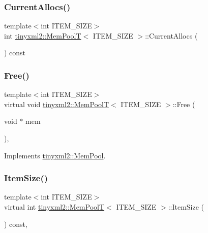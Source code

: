 \subsubsection{\texorpdfstring{Current\+Allocs()}{CurrentAllocs()}}
{\footnotesize\ttfamily template$<$int I\+T\+E\+M\+\_\+\+S\+I\+ZE$>$ \\
int \mbox{\hyperlink{classtinyxml2_1_1_mem_pool_t}{tinyxml2\+::\+Mem\+PoolT}}$<$ I\+T\+E\+M\+\_\+\+S\+I\+ZE $>$\+::Current\+Allocs (\begin{DoxyParamCaption}{ }\end{DoxyParamCaption}) const\hspace{0.3cm}{\ttfamily [inline]}}

\mbox{\label{classtinyxml2_1_1_mem_pool_t_a408ce0918e9d3d5e5e1cc4896944875f}} 
\subsubsection{\texorpdfstring{Free()}{Free()}}
{\footnotesize\ttfamily template$<$int I\+T\+E\+M\+\_\+\+S\+I\+ZE$>$ \\
virtual void \mbox{\hyperlink{classtinyxml2_1_1_mem_pool_t}{tinyxml2\+::\+Mem\+PoolT}}$<$ I\+T\+E\+M\+\_\+\+S\+I\+ZE $>$\+::Free (\begin{DoxyParamCaption}\item[{void $\ast$}]{mem }\end{DoxyParamCaption})\hspace{0.3cm}{\ttfamily [inline]}, {\ttfamily [virtual]}}



Implements \mbox{\hyperlink{classtinyxml2_1_1_mem_pool_a49e3bfac2cba2ebd6776b31e571f64f7}{tinyxml2\+::\+Mem\+Pool}}.

\mbox{\label{classtinyxml2_1_1_mem_pool_t_a54e4d9b343459ef1731314a99877ff35}} 
\subsubsection{\texorpdfstring{Item\+Size()}{ItemSize()}}
{\footnotesize\ttfamily template$<$int I\+T\+E\+M\+\_\+\+S\+I\+ZE$>$ \\
virtual int \mbox{\hyperlink{classtinyxml2_1_1_mem_pool_t}{tinyxml2\+::\+Mem\+PoolT}}$<$ I\+T\+E\+M\+\_\+\+S\+I\+ZE $>$\+::Item\+Size (\begin{DoxyParamCaption}{ }\end{DoxyParamCaption}) const\hspace{0.3cm}{\ttfamily [inline]}, {\ttfamily [virtual]}}



